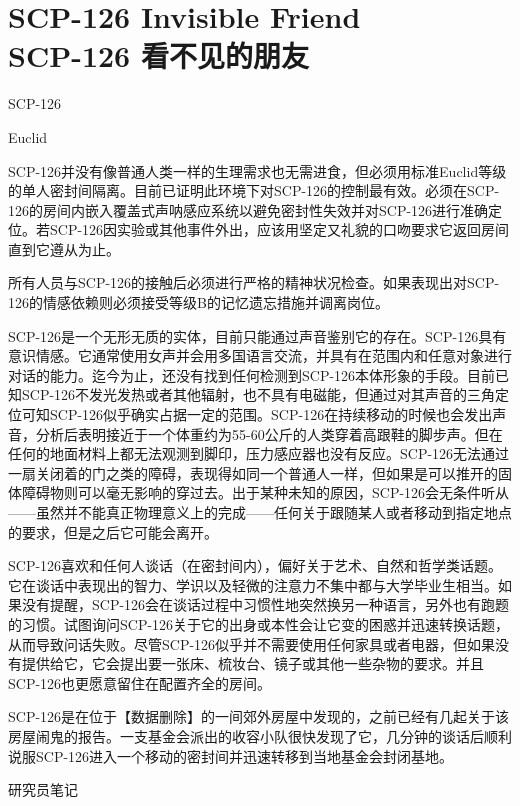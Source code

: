 \chapter[SCP-126 看不见的朋友]{
    SCP-126 Invisible Friend\\
    SCP-126 看不见的朋友
}

\label{chap:SCP-126}

SCP-126

Euclid

SCP-126并没有像普通人类一样的生理需求也无需进食，但必须用标准Euclid等级的单人密封间隔离。目前已证明此环境下对SCP-126的控制最有效。必须在SCP-126的房间内嵌入覆盖式声呐感应系统以避免密封性失效并对SCP-126进行准确定位。若SCP-126因实验或其他事件外出，应该用坚定又礼貌的口吻要求它返回房间直到它遵从为止。

所有人员与SCP-126的接触后必须进行严格的精神状况检查。如果表现出对SCP-126的情感依赖则必须接受等级B的记忆遗忘措施并调离岗位。

SCP-126是一个无形无质的实体，目前只能通过声音鉴别它的存在。SCP-126具有意识情感。它通常使用女声并会用多国语言交流，并具有在范围内和任意对象进行对话的能力。迄今为止，还没有找到任何检测到SCP-126本体形象的手段。目前已知SCP-126不发光发热或者其他辐射，也不具有电磁能，但通过对其声音的三角定位可知SCP-126似乎确实占据一定的范围。SCP-126在持续移动的时候也会发出声音，分析后表明接近于一个体重约为55-60公斤的人类穿着高跟鞋的脚步声。但在任何的地面材料上都无法观测到脚印，压力感应器也没有反应。SCP-126无法通过一扇关闭着的门之类的障碍，表现得如同一个普通人一样，但如果是可以推开的固体障碍物则可以毫无影响的穿过去。出于某种未知的原因，SCP-126会无条件听从——虽然并不能真正物理意义上的完成——任何关于跟随某人或者移动到指定地点的要求，但是之后它可能会离开。

SCP-126喜欢和任何人谈话（在密封间内），偏好关于艺术、自然和哲学类话题。它在谈话中表现出的智力、学识以及轻微的注意力不集中都与大学毕业生相当。如果没有提醒，SCP-126会在谈话过程中习惯性地突然换另一种语言，另外也有跑题的习惯。试图询问SCP-126关于它的出身或本性会让它变的困惑并迅速转换话题，从而导致问话失败。尽管SCP-126似乎并不需要使用任何家具或者电器，但如果没有提供给它，它会提出要一张床、梳妆台、镜子或其他一些杂物的要求。并且SCP-126也更愿意留住在配置齐全的房间。

SCP-126是在位于【数据删除】的一间郊外房屋中发现的，之前已经有几起关于该房屋闹鬼的报告。一支基金会派出的收容小队很快发现了它，几分钟的谈话后顺利说服SCP-126进入一个移动的密封间并迅速转移到当地基金会封闭基地。

研究员笔记

